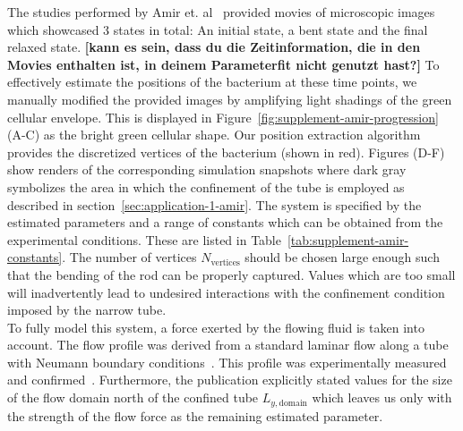 The studies performed by Amir et. al~\cite{Amir2014,Amir2014_2} provided movies of microscopic
images which showcased 3 states in total:
An initial state, a bent state and the final relaxed state.
{\bf [kann es sein, dass du die Zeitinformation, die in den Movies enthalten ist, in deinem Parameterfit nicht genutzt hast?]}
To effectively estimate the positions of the bacterium at these time points, we manually modified
the provided images by amplifying light shadings of the green cellular envelope.
This is displayed in Figure~\ref{fig:supplement-amir-progression} (A-C) as the bright green cellular
shape.
Our position extraction algorithm provides the discretized vertices of the bacterium (shown in red).
Figures (D-F) show renders of the corresponding simulation snapshots where dark gray symbolizes the
area in which the confinement of the tube is employed as described in
section~\ref{sec:application-1-amir}.
The system is specified by the estimated parameters and a range of constants which can be obtained
from the experimental conditions.
These are listed in Table~\ref{tab:supplement-amir-constants}.
The number of vertices $N_\text{vertices}$ should be chosen large enough such that the bending of
the rod can be properly captured.
Values which are too small will inadvertently lead to undesired interactions with the confinement
condition imposed by the narrow tube.\\
To fully model this system, a force exerted by the flowing fluid is taken into account.
The flow profile was derived from a standard laminar flow along a tube with Neumann boundary
conditions~\cite{Wolschin2021}.
This profile was experimentally measured and confirmed~\cite{Amir2014}.
Furthermore, the publication explicitly stated values for the size of the flow domain north of the
confined tube $L_{y,\text{domain}}$ which leaves us only with the strength of the flow force as the
remaining estimated parameter.

